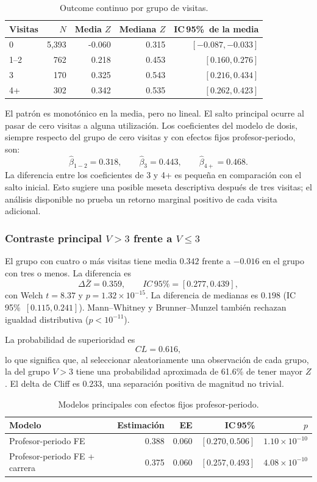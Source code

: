 \documentclass[11pt,letterpaper]{article}
\newcommand{\CI}{IC\,95\%}
\begin{document}
\begin{table}[H]
\centering
\caption{Outcome continuo por grupo de visitas.}
\label{tab:primarydesc}
\begin{tabular}{@{}lrrrr@{}}
\toprule
\textbf{Visitas} & \textbf{$N$} & \textbf{Media $Z$} & \textbf{Mediana $Z$} & \textbf{\CI\ de la media} \\
\midrule
0 & 5,393 & -0.060 & 0.315 & $[-0.087,-0.033]$ \\
1--2 & 762 & 0.218 & 0.453 & $[0.160,0.276]$ \\
3 & 170 & 0.325 & 0.543 & $[0.216,0.434]$ \\
4+ & 302 & 0.342 & 0.535 & $[0.262,0.423]$ \\
\bottomrule
\end{tabular}
\end{table}

El patrón es monotónico en la media, pero no lineal. El salto principal ocurre al pasar de cero visitas a alguna utilización. Los coeficientes del modelo de dosis, siempre respecto del grupo de cero visitas y con efectos fijos profesor-periodo, son:
\[
\hat\beta_{1-2}=0.318,\qquad
\hat\beta_{3}=0.443,\qquad
\hat\beta_{4+}=0.468.
\]
La diferencia entre los coeficientes de 3 y 4+ es pequeña en comparación con el salto inicial. Esto sugiere una posible meseta descriptiva después de tres visitas; el análisis disponible no prueba un retorno marginal positivo de cada visita adicional.

\subsubsection{Contraste principal $V>3$ frente a $V\leq3$}

El grupo con cuatro o más visitas tiene media $0.342$ frente a $-0.016$ en el grupo con tres o menos. La diferencia es
\[
\Delta\bar Z=0.359,\qquad \CI=[0.277,0.439],
\]
con Welch $t=8.37$ y $p=1.32\times10^{-15}$. La diferencia de medianas es $0.198$ (\CI\ $[0.115,0.241]$). Mann--Whitney y Brunner--Munzel también rechazan igualdad distributiva ($p<10^{-11}$).

La probabilidad de superioridad es
\[
CL=0.616,
\]
lo que significa que, al seleccionar aleatoriamente una observación de cada grupo, la del grupo $V>3$ tiene una probabilidad aproximada de 61.6\% de tener mayor $Z$. El delta de Cliff es $0.233$, una separación positiva de magnitud no trivial.

\begin{table}[H]
\centering
\caption{Modelos principales con efectos fijos profesor-periodo.}
\label{tab:femodels}
\begin{tabular}{@{}lrrrr@{}}
\toprule
\textbf{Modelo} & \textbf{Estimación} & \textbf{EE} & \textbf{\CI} & \textbf{$p$} \\
\midrule
Profesor-periodo FE & 0.388 & 0.060 & $[0.270,0.506]$ & $1.10\times10^{-10}$ \\
Profesor-periodo FE + carrera & 0.375 & 0.060 & $[0.257,0.493]$ & $4.08\times10^{-10}$ \\
\bottomrule
\end{tabular}
\end{table}
\end{document}
